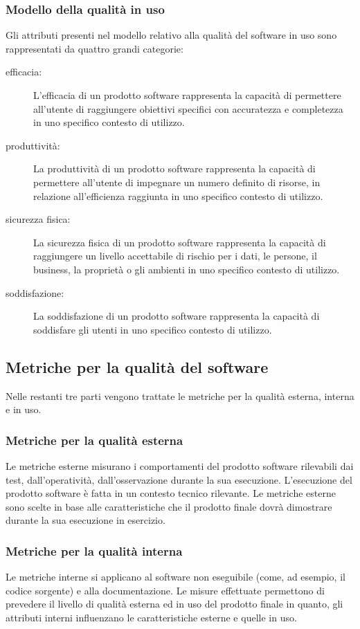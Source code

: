\documentclass[../PianoDiQualifica.tex]{subfiles}
\begin{document}
\begin{appendices}
		\subsubsection{Modello della qualità in uso}
		Gli attributi presenti nel modello relativo alla qualità del software in uso sono rappresentati da quattro grandi categorie:
		\begin{description}
			\item[efficacia:] L'efficacia di un prodotto software rappresenta la capacità di permettere all'utente di raggiungere obiettivi specifici con accuratezza e completezza in uno specifico contesto di utilizzo.
			\item[produttività:] La produttività di un prodotto software rappresenta la capacità di permettere all'utente di impegnare un numero definito di risorse, in relazione all’efficienza raggiunta in uno specifico contesto di utilizzo.
			\item[sicurezza fisica:] La sicurezza fisica di un prodotto software rappresenta la capacità di raggiungere un livello accettabile di rischio per i dati, le persone, il business, la proprietà o gli ambienti in uno specifico contesto di utilizzo.
			\item[soddisfazione:] La soddisfazione di un prodotto software rappresenta la capacità di soddisfare gli utenti in uno specifico contesto di utilizzo.
		\end{description}
	
	\subsection{Metriche per la qualità del software}
	Nelle restanti tre parti vengono trattate le metriche per la qualità esterna, interna e in uso.
	
	\subsubsection{Metriche per la qualità esterna}
	Le metriche esterne misurano i comportamenti del prodotto software rilevabili dai test, dall'operatività, dall'osservazione durante la sua esecuzione. L'esecuzione del prodotto software è fatta in un contesto tecnico rilevante.
	Le metriche esterne sono scelte in base alle caratteristiche che il prodotto finale dovrà dimostrare durante la sua esecuzione in esercizio.
	
	\subsubsection{Metriche per la qualità interna}
	Le metriche interne si applicano al software non eseguibile (come, ad esempio, il codice sorgente) e alla documentazione. Le misure effettuate permettono di prevedere il livello di qualità esterna ed in uso del prodotto finale in quanto, gli attributi interni influenzano le caratteristiche esterne e quelle in uso.
	

\end{appendices}
\end{document}

